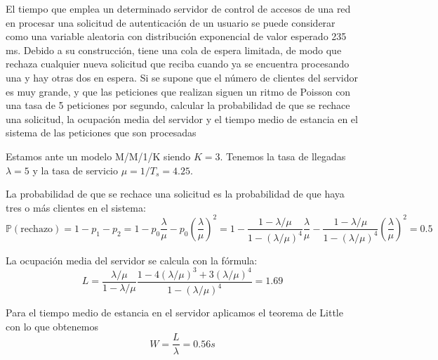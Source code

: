 
\begin{problem}[16]
El tiempo que emplea un determinado servidor de control de accesos de una red en procesar una solicitud de autenticación de un usuario se puede considerar como una variable aleatoria con distribución exponencial de valor esperado 235 ms. Debido a su construcción, tiene una cola de espera limitada, de modo que rechaza cualquier nueva solicitud que reciba cuando ya se encuentra procesando una y hay otras dos en espera. Si se supone que el número de clientes del servidor es muy grande, y que las peticiones que realizan siguen un ritmo de Poisson con una tasa de 5 peticiones por segundo, calcular la probabilidad de que se rechace una solicitud, la ocupación media del servidor y el tiempo medio de estancia en el sistema de las peticiones que son procesadas

\solution

Estamos ante un modelo M/M/1/K siendo $K=3$. Tenemos la tasa de llegadas $λ=5$ y la tasa de servicio $μ=1/T_s=4.25$.

La probabilidad de que se rechace una solicitud es la probabilidad de que haya tres o más clientes en el sistema:
\[\mathbb{P}(\text{rechazo}) = 1- p_1-p_2 = 1-p_0\frac{λ}{μ}-p_0\left( \frac{λ}{μ}\right)^2 = 1-\frac{1-λ/μ}{1-(λ/μ)^{4}}\frac{λ}{μ}-\frac{1-λ/μ}{1-(λ/μ)^{4}}\left( \frac{λ}{μ}\right)^2 = 0.5\]

La ocupación media del servidor se calcula con la fórmula:
\[L=\frac{λ/μ}{1-λ/μ}\frac{1-4(λ/μ)^3+3(λ/μ)^4}{1-(λ/μ)^4}=1.69\]

Para el tiempo medio de estancia en el servidor aplicamos el teorema de Little con lo que obtenemos
\[W = \frac{L}{λ}=0.56s\]

\end{problem}


